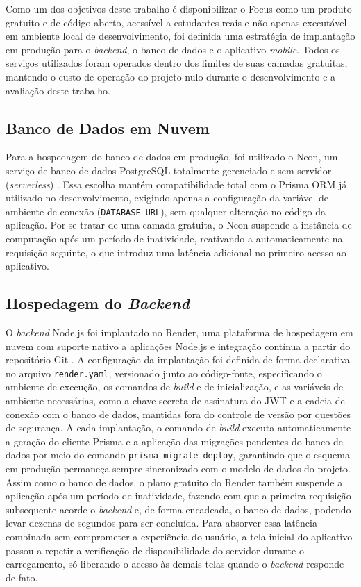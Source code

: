 Como um dos objetivos deste trabalho é disponibilizar o Focus como um produto gratuito e de código aberto, acessível a estudantes reais e não apenas executável em ambiente local de desenvolvimento, foi definida uma estratégia de implantação em produção para o \textit{backend}, o banco de dados e o aplicativo \textit{mobile}.
Todos os serviços utilizados foram operados dentro dos limites de suas camadas gratuitas, mantendo o custo de operação do projeto nulo durante o desenvolvimento e a avaliação deste trabalho.

\subsection{Banco de Dados em Nuvem}

Para a hospedagem do banco de dados em produção, foi utilizado o Neon, um serviço de banco de dados PostgreSQL totalmente gerenciado e sem servidor (\textit{serverless}) \cite{neon_2026}.
Essa escolha mantém compatibilidade total com o Prisma ORM já utilizado no desenvolvimento, exigindo apenas a configuração da variável de ambiente de conexão (\texttt{DATABASE\_URL}), sem qualquer alteração no código da aplicação.
Por se tratar de uma camada gratuita, o Neon suspende a instância de computação após um período de inatividade, reativando-a automaticamente na requisição seguinte, o que introduz uma latência adicional no primeiro acesso ao aplicativo.

\subsection{Hospedagem do \textit{Backend}}

O \textit{backend} Node.js foi implantado no Render, uma plataforma de hospedagem em nuvem com suporte nativo a aplicações Node.js e integração contínua a partir do repositório Git \cite{render_2026}.
A configuração da implantação foi definida de forma declarativa no arquivo \texttt{render.yaml}, versionado junto ao código-fonte, especificando o ambiente de execução, os comandos de \textit{build} e de inicialização, e as variáveis de ambiente necessárias, como a chave secreta de assinatura do JWT e a cadeia de conexão com o banco de dados, mantidas fora do controle de versão por questões de segurança.
A cada implantação, o comando de \textit{build} executa automaticamente a geração do cliente Prisma e a aplicação das migrações pendentes do banco de dados por meio do comando \texttt{prisma migrate deploy}, garantindo que o esquema em produção permaneça sempre sincronizado com o modelo de dados do projeto.
Assim como o banco de dados, o plano gratuito do Render também suspende a aplicação após um período de inatividade, fazendo com que a primeira requisição subsequente acorde o \textit{backend} e, de forma encadeada, o banco de dados, podendo levar dezenas de segundos para ser concluída.
Para absorver essa latência combinada sem comprometer a experiência do usuário, a tela inicial do aplicativo passou a repetir a verificação de disponibilidade do servidor durante o carregamento, só liberando o acesso às demais telas quando o \textit{backend} responde de fato.

